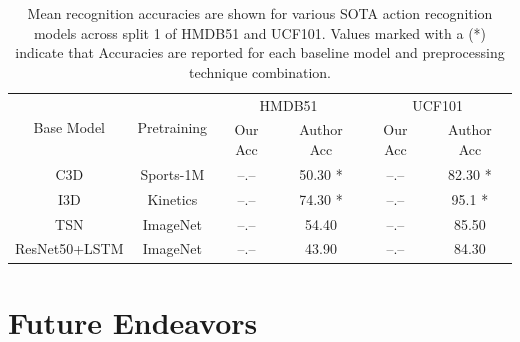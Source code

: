 \documentclass{llncs}
\begin{document}
\begin{table}[h!]
\begin{center}
\caption{Mean recognition accuracies are shown for various SOTA action recognition models across split 1 of HMDB51 and UCF101.
Values marked with a (*) indicate that  
Accuracies are reported for each baseline model and preprocessing technique combination.}
\label{tab:model_results}
\begin{tabular}{c|c|c|c||c|c}
\hline
\multirow{2}{*}{Base Model} & \multirow{2}{*}{Pretraining} & \multicolumn{2}{c||}{HMDB51} & \multicolumn{2}{c}{UCF101} \\\cline{3-6}
& & Our Acc & Author Acc & Our Acc & Author Acc \\
\hline
C3D & Sports-1M & --.-- & 50.30 * & --.-- & 82.30 * \\
\hline
I3D & Kinetics & --.-- & 74.30 * & --.-- & 95.1 * \\
\hline
TSN & ImageNet & --.-- & 54.40 & --.-- & 85.50 \\
\hline
ResNet50+LSTM & ImageNet & --.-- & 43.90 & --.-- & 84.30 \\
\hline
\end{tabular}
\end{center}
\end{table}


\section{Future Endeavors}
\label{sec:future}


\clearpage



\end{document}
